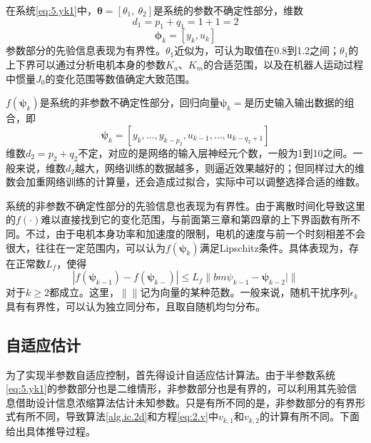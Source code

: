 在系统\eqref{eq:5.yk1}中，$\bm{\theta}=[\theta_{1},\ \theta_{2}]$是系统的参数不确定性部分，维数
$$d_{1}=p_{1}+q_{1}=1+1=2$$
$$\bm{\phi}_{k}=[y_{k},u_{k}]$$
参数部分的先验信息表现为有界性。$\theta_{1}$近似为，可认为取值在0.8到1.2之间；$\theta_{1}$的上下界可以通过分析电机本身的参数$K_{a}$、$K_{m}$的合适范围，以及在机器人运动过程中惯量$J_{0}$的变化范围等数值确定大致范围。

$f(\bm{\psi}_{k})$是系统的非参数不确定性部分，回归向量$\bm{\psi}_{k}=$是历史输入输出数据的组合，即
$$\bm{\psi}_{k}=[y_{k},\ldots,y_{k-p_{2}},u_{k-1},\dots,u_{k-q_{2}+1}]$$
维数$d_{2}=p_{2}+q_{2}$不定，对应的是网络的输入层神经元个数，一般为1到10之间。一般来说，维数$d_{2}$越大，网络训练的数据越多，则逼近效果越好的；但同样过大的维数会加重网络训练的计算量，还会造成过拟合，实际中可以调整选择合适的维数。

系统的非参数不确定性部分的先验信息也表现为有界性。由于离散时间化导致这里的$f(\cdot)$难以直接找到它的变化范围，与前面第三章和第四章的上下界函数有所不同。不过，由于电机本身功率和加速度的限制，电机的速度与前一个时刻相差不会很大，往往在一定范围内，可以认为$f(\bm{\psi}_{k})$满足Lipschitz条件。具体表现为，存在正常数$L_{f}$，使得
\begin{equation}\label{eq:5.flim}
|f(\bm{\psi}_{k-1})-f(\bm{\psi}_{k-})|\leq L_{f}\|bm{\psi}_{k-1}-\bm{\psi}_{k-2}|\|
\end{equation}
对于$k\geq2$都成立。这里，$\|\|$记为向量的某种范数。一般来说，随机干扰序列$\epsilon_{k}$具有有界性，可以认为独立同分布，且取自随机均匀分布。

\subsection{自适应估计}\label{5.2.2}
为了实现半参数自适应控制，首先得设计自适应估计算法。由于半参数系统\eqref{eq:5.yk1}的参数部分也是二维情形，非参数部分也是有界的，可以利用其先验信息借助设计信息浓缩算法估计未知参数。只是有所不同的是，非参数部分的有界形式有所不同，导致算法\ref{alg.ic.2d}和方程\eqref{eq:2.v}中$v_{k,1}$和$v_{k,2}$的计算有所不同。下面给出具体推导过程。

